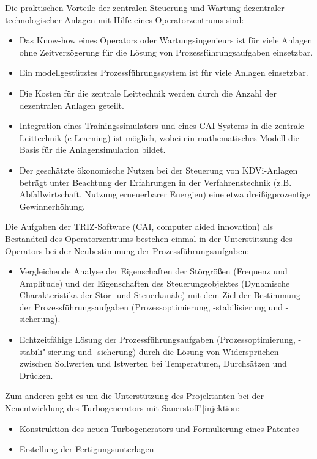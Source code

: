 \documentclass[11pt,a4paper]{article}
\begin{document}
Die praktischen Vorteile der zentralen Steuerung und Wartung dezentraler
technologischer Anlagen mit Hilfe eines Operatorzentrums sind:
\begin{itemize}
\item Das Know-how eines Operators oder Wartungsingenieurs ist für viele
  Anlagen ohne Zeitverzögerung für die Lösung von Prozessführungsaufgaben
  einsetzbar.
\item Ein modellgestütztes Prozessführungssystem ist für viele Anlagen
  einsetzbar.
\item Die Kosten für die zentrale Leittechnik werden durch die Anzahl der
  dezentralen Anlagen geteilt.
\item Integration eines Trainingssimulators und eines CAI-Systems in die
  zentrale Leittechnik (e-Learning) ist möglich, wobei ein mathematisches
  Modell die Basis für die Anlagensimulation bildet.
\item Der geschätzte ökonomische Nutzen bei der Steuerung von KDVi-Anlagen
  beträgt unter Beachtung der Erfahrungen in der Verfahrenstechnik
  (z.B. Abfallwirtschaft, Nutzung erneuerbarer Energien) eine etwa
  dreißigprozentige Gewinnerhöhung.
\end{itemize}

Die Aufgaben der TRIZ-Software (CAI, computer aided innovation) als Bestandteil
des Operatorzentrums bestehen einmal in der Unterstützung des Operators bei der
Neubestimmung der Prozessführungsaufgaben:
\begin{itemize}
\item Vergleichende Analyse der Eigenschaften der Störgrößen (Frequenz und
  Amplitude) und der Eigenschaften des Steuerungsobjektes (Dynamische
  Charakteristika der Stör- und Steuerkanäle) mit dem Ziel der Bestimmung der
  Prozessführungsaufgaben (Prozessoptimierung, -stabilisierung und
  -sicherung). 
 \item Echtzeitfähige Lösung der Prozessführungsaufgaben
   (Prozessoptimierung, -stabili"|sierung und -sicherung) durch die Lösung von
   Widersprüchen zwischen Sollwerten und Istwerten bei Temperaturen,
   Durchsätzen und Drücken.
\end{itemize}
Zum anderen geht es um die Unterstützung des Projektanten bei der
Neuentwicklung des Turbogenerators mit Sauerstoff"|injektion:
\begin{itemize}
\item Konstruktion des neuen Turbogenerators und Formulierung eines Patentes
\item Erstellung der Fertigungsunterlagen
\end{itemize}
\end{document}
